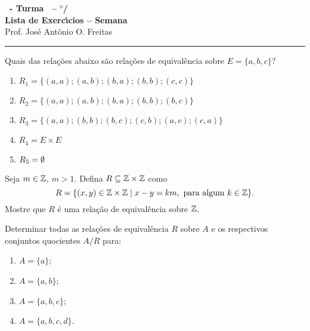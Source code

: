 \documentclass[12pt]{exam}
\begin{document}
    \begin{center}
    {\Large\bf \disciplina\ - Turma \turma\ -- \semestre$^{o}$/\ano} \\ \vspace{9pt} {\large\bf
        Lista de Exerc{\'\i}cios -- Semana \numerosemana}\\ \vspace{9pt} Prof. Jos{\'e} Ant{\^o}nio O. Freitas
    \end{center}
    \hrule

    \vspace{.6cm}

    \questao{} Quais das rela{\c c}{\~o}es abaixo s{\~a}o rela{\c c}{\~o}es de equival{\^e}ncia sobre $E = \{a,b,c\}$?
    \begin{enumerate}[label={\alph*})]
        \item $R_1 = \{(a,a);(a,b);(b,a);(b,b);(c,c)\}$
        \item $R_2 = \{(a,a);(a,b);(b,a);(b,b);(b,c)\}$
        \item $R_3 = \{(a,a);(b,b);(b,c);(c,b);(a,c);(c,a)\}$
        \item $R_4 = E \times E$
        \item $R_5 = \emptyset$
    \end{enumerate}

    \vspace{.3cm}

    \questao{} Seja $m \in \mathbb{Z}$, $m > 1$. Defina $R \subseteq \mathbb{Z}\times\mathbb{Z}$ como
    \[
      R = \{(x,y) \in \mathbb{Z}\times\mathbb{Z} \mid x - y = km, \mbox{ para algum } k \in \mathbb{Z}\}.
    \]
    Mostre que $R$ \'e uma rela\c{c}\~ao de equival\^encia sobre $\mathbb{Z}$.

    \vspace{.3cm}

    \questao{} Determinar todas as rela{\c c}{\~o}es de equival{\^e}ncia
    $R$ sobre $A$ e os respectivos conjuntos quocientes $A/R$ para:
    \begin{enumerate}[label={\alph*})]
        \item $A=\{a\}$;
        \item $A=\{a,b\}$;
        \item $A=\{a,b,c\}$;
        \item $A=\{a,b,c,d\}$.
    \end{enumerate}

    \vspace{.3cm}
\end{document}
